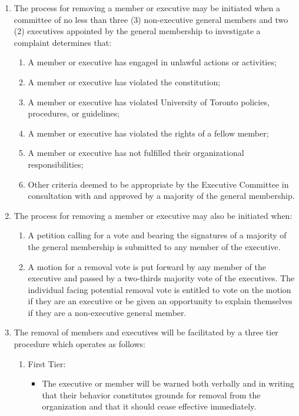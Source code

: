 \documentclass[12pt]{article}
\begin{document}
\begin{enumerate}[{5}.1]
    \item The process for removing a member or executive may be initiated when a committee of no less than three (3) non-executive general members and two (2) executives appointed by the general membership to investigate a complaint determines that:
    \begin{enumerate}[{5.1}.1]
        \item	A member or executive has engaged in unlawful actions or activities;
        \item	A member or executive has violated the constitution;
        \item	A member or executive has violated University of Toronto policies, procedures, or guidelines;
        \item	A member or executive has violated the rights of a fellow member;
        \item	A member or executive has not fulfilled their organizational responsibilities;
        \item	Other criteria deemed to be appropriate by the Executive Committee in consultation with and approved by a majority of the general membership. 
    \end{enumerate}
    \item The process for removing a member or executive may also be initiated when:
    \begin{enumerate}[{5.2}.1]
        \item	A petition calling for a vote and bearing the signatures of a majority of the general membership is submitted to any member of the executive.
        \item A motion for a removal vote is put forward by any member of the executive and passed by a two-thirds majority vote of the executives.  The individual facing potential removal vote is entitled to vote on the motion if they are an executive or be given an opportunity to explain themselves if they are a non-executive general member.
    \end{enumerate}
    \item The removal of members and executives will be facilitated by a three tier procedure which operates as follows: 
    \begin{enumerate}[{5.3}.1]
        \item First Tier:
        \begin{itemize}
            \item The executive or member will be warned both verbally and in writing that their behavior constitutes grounds for removal from the organization and that it should cease effective immediately. 

\end{itemize}
\end{enumerate}
\end{enumerate}
\end{document}
